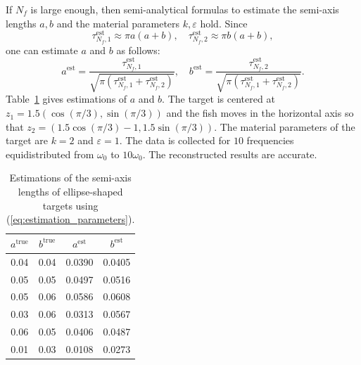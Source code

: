 If $N_f$ is large enough, then semi-analytical formulas to estimate
the semi-axis lengths $a,b$ and the material parameters $k,
\varepsilon$ hold. Since
$$ \tau_{N_f,1}^{\mbox {est}} \approx \pi a(a+b),\quad  \tau_{N_f,2}^{\mbox {est}} \approx \pi
b(a+b),$$ one can estimate $a$ and $b$ as follows:
\begin{equation}
a^{\textrm{est}}  =\frac{\tau_{N_f,1}^{\mbox
{est}}}{\sqrt{\pi\left(\tau_{N_f,1}^{\mbox {est}} +\tau_{N_f,2}^{\mbox
{est}}\right)}},\quad  b^{\textrm{est}}  =\frac{\tau_{N_f,2}^{\mbox
{est}}}{\sqrt{\pi\left(\tau_{N_f,1}^{\mbox {est}}+\tau_{N_f,2}^{\mbox
{est}}\right)}}. \label{eq:estimation_parameters}
\end{equation}
Table~\ref{tab:characteriaztion_geometric_parameters} gives
 estimations of $a$ and $b$. The target is centered at $z_{1}=1.5(\cos(\pi/3),\sin(\pi/3))$
and the fish moves in the horizontal axis so that
$z_{2}=(1.5\cos(\pi/3)-1,1.5\sin(\pi/3))$. The material parameters
of the target are $k=2$ and $\varepsilon=1$.  The data is
collected for $10$ frequencies equidistributed from $\omega_0$ to
$10 \omega_0$. The reconstructed results are accurate.

\begin{table}[!h]
\centering%
\begin{tabular}{|c|c||c|c|}
\hline $a^{\textrm{true}}$ & $b^{\textrm{true}}$ & $a^{\textrm{est}}$ & $b^{\textrm{est}}$
\tabularnewline \hline \hline 0.04 & 0.04 & 0.0390 &
0.0405\tabularnewline \hline 0.05 & 0.05 & 0.0497 &
0.0516\tabularnewline \hline 0.05 & 0.06 & 0.0586 &
0.0608\tabularnewline \hline \hline 0.03 & 0.06 & 0.0313 &
0.0567\tabularnewline \hline 0.06 & 0.05 & 0.0406 &
0.0487\tabularnewline \hline 0.01 & 0.03 & 0.0108 &
0.0273\tabularnewline \hline
\end{tabular}
\caption{Estimations of the semi-axis lengths of ellipse-shaped
targets using
(\ref{eq:estimation_parameters}).\label{tab:characteriaztion_geometric_parameters}}
\end{table}

